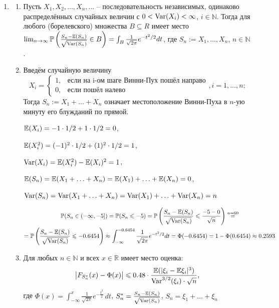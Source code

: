 \documentclass[12pt, a4paper]{article}\usepackage[]{graphicx}\usepackage[]{color}
\begin{document}
\begin{enumerate}
\item \begin{enumerate}
	\item Пусть $X_1, X_2, \ldots, X_n, \ldots$ – последовательность независимых, одинаково распределённых случайных величин с $0<\operatorname{Var}(X_i)<\infty$, $i \in \mathbb{N}$.  Тогда для любого (борелевского) множества $B \subseteq R$ имеет место $\lim_{n \to \infty} \mathbb{P}\left(\frac{S_n - \mathbb{E}(S_n)}{\sqrt{\operatorname{Var}(S_n)}} \in B\right) = \int_B \frac{1}{\sqrt{2\pi}}e^{-t^2/2} dt$, где $S_n := X_1, \ldots, X_n$, $n \in \mathbb{N}$.
	\item Введём случайную величину
	\[
	X_i = \begin{cases}
	1, & \text{если на i-ом шаге Винни-Пух пошёл направо} \\
	0, & \text{если пошёл налево}
	\end{cases}
	, i=1,\ldots, n;
	\]
	Тогда $S_n := X_1 +\ldots+X_n$ означает местоположение Винни-Пуха в $n$-ую минуту его блужданий по прямой.

	$\mathbb{E}(X_i) = -1 \cdot 1/2 + 1 \cdot 1/2 = 0$,

	$\mathbb{E}(X_i^2) = (-1)^2 \cdot 1/2 + (1)^2 \cdot 1/2 = 1$,

	$\operatorname{Var}(X_i) = \mathbb{E}(X_i^2) - \mathbb{E}(X_i)^2 = 1$,

	$\mathbb{E}(S_n) = \mathbb{E}(X_1 + \ldots + X_n ) = \mathbb{E}(X_1) + \ldots + \mathbb{E}(X_n) = 0$,

	$\operatorname{Var}(S_n) = \operatorname{Var}(X_1 + \ldots + X_n ) = \operatorname{Var}(X_1) + \ldots + \operatorname{Var}(X_n) = n$

	\begin{multline}
	\mathbb{P}(S_n \in (-\infty, -5]) = \mathbb{P}(S_n \leqslant -5) = \mathbb{P}\left( \frac{S_n-\mathbb{E}(S_n)}{\sqrt{\operatorname{Var}(S_n)}} \leqslant \frac{-5-0}{\sqrt{n}} \right) \stackrel{n=60}{=} \\
	 =\mathbb{P}\left( \frac{S_n-\mathbb{E}(S_n)}{\sqrt{\operatorname{Var}(S_n)}} \leqslant -0.6454\right) \approx \int_{-\infty}^{-0.6454} \frac{1}{\sqrt{2\pi}} e^{-t^2/2} dt = \Phi(-0.6454) = 1-\Phi(0.6454) \approx0.2593
	\end{multline}
	\item Для любых $n \in \mathbb{N}$ и всех $x \in \mathbb{R}$ имеет место оценка:
	\[
	\bigl|F_{S_n^{*}}(x) - \Phi(x)\bigr| \leqslant 0.48 \cdot \frac{\mathbb{E}(|\xi_i - \mathbb{E}\xi_i|^3)}{\operatorname{Var}^{3/2}(\xi_i)\cdot\sqrt{n}} \text{,}
	\]
	где $\Phi(x) = \int_{-\infty}^{x}\frac{1}{\sqrt{2\pi}}e^{-\frac{t^2}{2}}\,dt$, \; $S_n^* = \frac{S_n - \mathbb{E}(S_n)}{\sqrt{\operatorname{Var}(S_n)}}$, \; $S_n = \xi_1 + \ldots + \xi_n$


\end{enumerate}
\end{enumerate}
\end{document}

